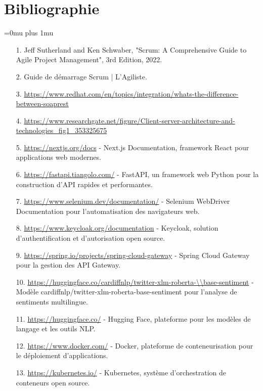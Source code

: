 \chapter*{Bibliographie}

\def\UrlBreaks{\do\/\do-\do.\do=\do_}
\Urlmuskip=0mu plus 1mu

\begin{itemize}[leftmargin=1cm, itemsep=0.3em, parsep=0.2em]
    \item[1.] Jeff Sutherland and Ken Schwaber, "Scrum: A Comprehensive Guide to Agile Project Management", 3rd Edition, 2022.
    \item[2.] Guide de démarrage Scrum | L'Agiliste.
    \item[3.] \url{https://www.redhat.com/en/topics/integration/whats-the-difference-between-soaprest}
    \item[4.] \url{https://www.researchgate.net/figure/Client-server-architecture-and-technologies_fig1_353325675}
    \item[5.] \url{https://nextjs.org/docs} - Next.js Documentation, framework React pour applications web modernes.
    \item[6.] \url{https://fastapi.tiangolo.com/} - FastAPI, un framework web Python pour la construction d'API rapides et performantes.
    \item[7.] \url{https://www.selenium.dev/documentation/} - Selenium WebDriver Documentation pour l'automatisation des navigateurs web.
    \item[8.] \url{https://www.keycloak.org/documentation} - Keycloak, solution d'authentification et d'autorisation open source.
    \item[9.] \url{https://spring.io/projects/spring-cloud-gateway} - Spring Cloud Gateway pour la gestion des API Gateway.
    \item[10.] \url{https://huggingface.co/cardiffnlp/twitter-xlm-roberta-\\base-sentiment} - Modèle cardiffnlp/twitter-xlm-roberta-base-sentiment pour l'analyse de sentiments multilingue.
    \item[11.] \url{https://huggingface.co/} - Hugging Face, plateforme pour les modèles de langage et les outils NLP.
    \item[12.] \url{https://www.docker.com/} - Docker, plateforme de conteneurisation pour le déploiement d'applications.
    \item[13.] \url{https://kubernetes.io/} - Kubernetes, système d'orchestration de conteneurs open source.

\end{itemize}

